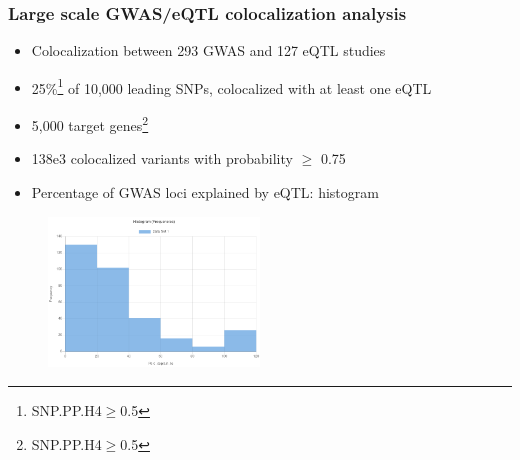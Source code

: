 \documentclass{beamer}
\begin{document}
    \begin{frame}
        \frametitle{Large scale GWAS/eQTL colocalization analysis}


        \begin{itemize}
            \item Colocalization between 293 GWAS and 127 eQTL studies
            \item 25\%\footnote{SNP.PP.H4$\geq$0.5} of 10,000 leading SNPs, colocalized with at least one eQTL
            \item 5,000 target genes\footnote{SNP.PP.H4$\geq$0.5}
            \item 138e3 colocalized variants with probability $\geq$ 0.75
            \item Percentage of GWAS loci explained by eQTL: histogram
        \end{itemize}

        \begin{figure}[!]
            \includegraphics[width=0.5\textwidth]{fig/histogram_explained.png}\label{fig:perc_explained}
        \end{figure}

    \end{frame}
\end{document}
